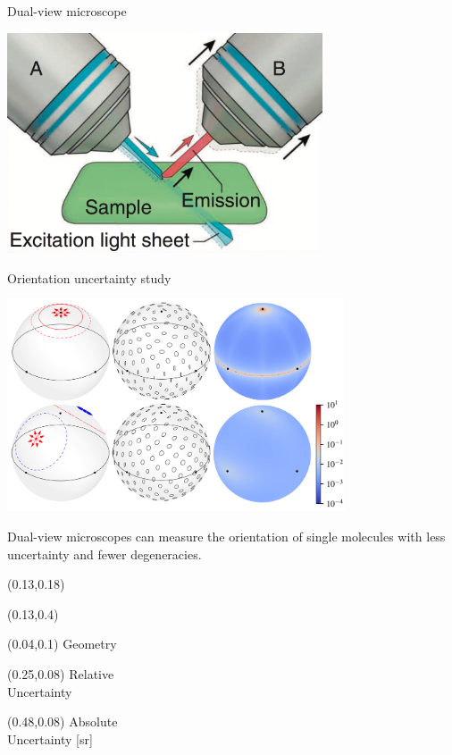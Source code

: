 \documentclass[presentation]{beamer}
\begin{document}
\begin{frame}[label=sec-1]{Dual-view microscope}
 \begin{center}
   \includegraphics[width=0.7\textwidth]{figs/light-sheet.png}
 \end{center}
\end{frame}

\begin{frame}[label=sec-1]{Orientation uncertainty study}
  \vspace{0.5em}
 \begin{center}
   \includegraphics[width=0.75\textwidth]{figs/proposal-fig.png}
 \end{center}
 Dual-view microscopes can measure the orientation of single molecules with less
 uncertainty and fewer degeneracies.
 \small
 \setlength{\TPHorizModule}{\textwidth}
 \setlength{\TPVertModule}{\textwidth}
\begin{textblock}{0.5}(0.13,0.18)
\end{textblock}
\begin{textblock}{0.5}(0.13,0.4)
\end{textblock}
\begin{textblock}{0.5}(0.04,0.1)
  \centering
  Geometry
 \end{textblock}
 \begin{textblock}{0.5}(0.25,0.08)
   \centering
  Relative\\ Uncertainty
\end{textblock}
\begin{textblock}{0.5}(0.48,0.08)
  \centering  
  Absolute\\ Uncertainty [sr]
\end{textblock}
\end{frame}
\end{document}
